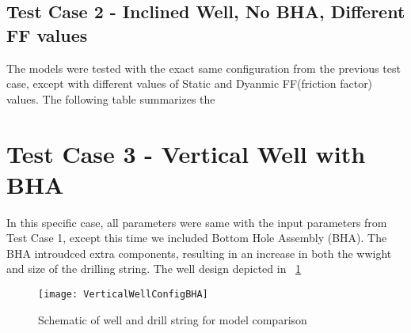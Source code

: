 % 
%
%
\subsection{Test Case 2 - Inclined Well, No BHA, Different FF values}

The models were tested with the exact same configuration from the previous test case, except with different values of Static and Dyanmic FF(friction factor) values. The following table summarizes the 

\section{Test Case 3 - Vertical Well with BHA}

In this specific case, all parameters were same with the input parameters from Test Case 1, except this time we included Bottom Hole Assembly (BHA). The BHA introudced extra components, resulting in an increase in both the wwight and size of the drilling string. The well design depicted in \figurename~\ref{Vert_well_conf_BHA}

\begin{figure}[!hbt]
  \centering
  \texttt{[image: VerticalWellConfigBHA]}
  \caption{Schematic of well and drill string for model comparison}\label{Vert_well_conf_BHA}
\end{figure}


